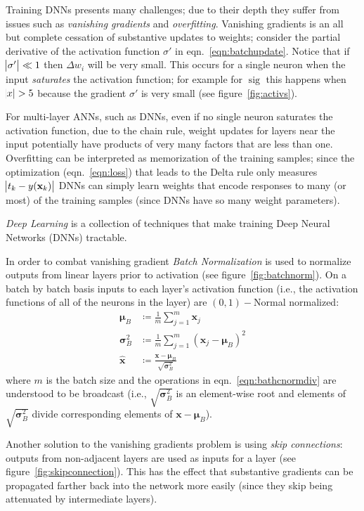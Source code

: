 Training DNNs presents many challenges; due to their depth they suffer from issues such as \textit{vanishing gradients} and \textit{overfitting}.
%
Vanishing gradients is an all but complete cessation of substantive updates to weights; consider the partial derivative of the activation function \(\sigma'\) in eqn.~\eqref{eqn:batchupdate}.
%
Notice that if \(\abs{\sigma'} \ll 1\) then \(\Delta w_i\) will be very small.
%
This occurs for a single neuron when the input \textit{saturates} the activation function; for example for \(\operatorname{sig}\) this happens when \(\abs{x} > 5\) because the gradient \(\sigma'\) is very small (see figure~\ref{fig:activs}).

%
For multi-layer ANNs, such as DNNs, even if no single neuron saturates the activation function,
due to the chain rule, weight updates for layers near the input potentially have products of very many factors that are less than one.
%
Overfitting can be interpreted as memorization of the training samples; since the optimization (eqn.~\eqref{eqn:loss}) that leads to the Delta rule only measures \(\abs{t_k - y(\mathbf{x}_k)}\) DNNs can simply learn weights that encode responses to many (or most) of the training samples (since DNNs have so many weight parameters).

\textit{Deep Learning} is a collection of techniques that make training Deep Neural Networks (DNNs) tractable.
%


In order to combat vanishing gradient \textit{Batch Normalization}\cite{ioffe2015batch} is used to normalize outputs from linear layers prior to activation (see figure~\ref{fig:batchnorm}).
%
On a batch by batch basis inputs to each layer's activation function (i.e., the activation functions of all of the neurons in the layer) are \((0,1)-\)Normal normalized:
\begin{align}
    \bm{\mu} _{B}        & \coloneqq {\frac {1}{m}}\sum _{j=1}^{m}\bm{x}_{j}                                             \\
    \bm{\sigma} _{B}^{2} & \coloneqq{\frac {1}{m}}\sum _{j=1}^{m}(\bm{x}_{j}-\bm{\mu}_{B})^{2}                           \\
    {\hat {\bm{x}}}      & \coloneqq {\frac {\bm{x}-\bm{\mu}_{B}}{\sqrt {\bm{\sigma}_{B}^{2}}}} \label{eqn:bathcnormdiv}
\end{align}
where \(m\) is the batch size and the operations in eqn.~\eqref{eqn:bathcnormdiv} are understood to be broadcast (i.e., \(\sqrt {\bm{\sigma} _{B}^{2}}\) is an element-wise root and elements of \(\sqrt {\bm{\sigma} _{B}^{2}}\) divide corresponding elements of \(\bm{x}-\bm{\mu}_{B}\)).
%

Another solution to the vanishing gradients problem is using \textit{skip connections}: outputs from non-adjacent layers are used as inputs for a layer (see figure~\ref{fig:skipconnection}).
%
This has the effect that substantive gradients can be propagated farther back into the network more easily (since they skip being attenuated by intermediate layers).

